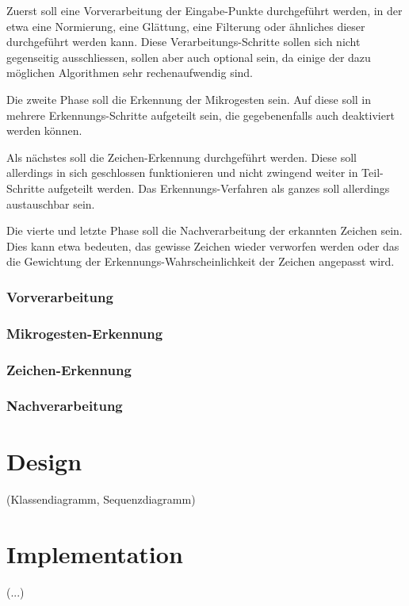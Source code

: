 Zuerst soll eine Vorverarbeitung der Eingabe-Punkte durchgeführt werden, in der etwa eine Normierung, eine Glättung, eine Filterung oder ähnliches dieser durchgeführt werden kann. Diese Verarbeitungs-Schritte sollen sich nicht gegenseitig ausschliessen, sollen aber auch optional sein, da einige der dazu möglichen Algorithmen sehr rechenaufwendig sind.

Die zweite Phase soll die Erkennung der Mikrogesten sein. Auf diese soll in mehrere Erkennungs-Schritte aufgeteilt sein, die gegebenenfalls auch deaktiviert werden können.

Als nächstes soll die Zeichen-Erkennung durchgeführt werden. Diese soll allerdings in sich geschlossen funktionieren und nicht zwingend weiter in Teil-Schritte aufgeteilt werden. Das Erkennungs-Verfahren als ganzes soll allerdings austauschbar sein.

Die vierte und letzte Phase soll die Nachverarbeitung der erkannten Zeichen sein. Dies kann etwa bedeuten, das gewisse Zeichen wieder verworfen werden oder das die Gewichtung der Erkennungs-Wahrscheinlichkeit der Zeichen angepasst wird.

\subsubsection{Vorverarbeitung}

\subsubsection{Mikrogesten-Erkennung}

\subsubsection{Zeichen-Erkennung}

\subsubsection{Nachverarbeitung}

\section{Design}

(Klassendiagramm, Sequenzdiagramm)

\section{Implementation}

(...)

